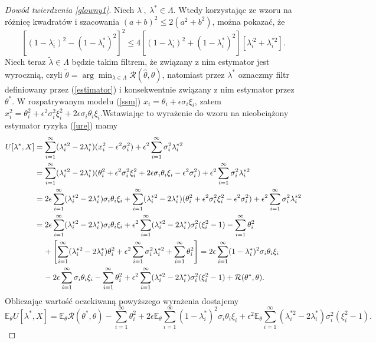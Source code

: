 \documentclass[man,mfiu]{mgrwms}
\begin{document}
\begin{proof}[Dowód twierdzenia \ref{glowny1}]
Niech $\lambda^{\cdot},\ \lambda^*\in \Lambda$. Wtedy korzystając ze wzoru na różnicę kwadratów i szacowania $(a+b)^2\leq 2(a^2+b^2)$, można pokazać, że
\begin{equation}\label{blad}
[(1-\lambda_i^{\cdot})^2-(1-\lambda_i^*)^2]^2\leq 4[(1-\lambda_i^{\cdot})^2+(1-\lambda_i^*)^2][\lambda_i^{\cdot 2}+\lambda_i^{*2}].
\end{equation}
Niech teraz $\tilde{\lambda}\in \Lambda$ będzie takim filtrem, że związany z nim estymator jest wyrocznią, czyli $\tilde{\theta}=\arg \min_{\lambda\in \Lambda}\mathcal{R}(\hat{\theta},\theta)$, natomiast przez $\lambda^*$ oznaczmy filtr definiowany przez (\ref{estimator}) i konsekwentnie związany z nim estymator przez $\theta^*$. W rozpatrywanym modelu (\ref{ssm}) $x_i=\theta_i+\epsilon\sigma_i\xi_i$, zatem $x_i^2=\theta_i^2+\epsilon^2\sigma_i^2\xi_i^2+2\epsilon\sigma_i\theta_i\xi_i$.Wstawiając to wyrażenie do wzoru na nieobciążony estymator ryzyka (\ref{ure}) mamy
\begin{displaymath}
\begin{split}
U[\lambda^*,X]&=\sum_{i=1}^{\infty}(\lambda_i^{*2}-2\lambda_i^*)(x_i^2-\epsilon^2\sigma_i^2)+\epsilon^2\sum_{i=1}^{\infty}\sigma_i^2\lambda_i^{*2}\\
&=\sum_{i=1}^{\infty}(\lambda_i^{*2}-2\lambda_i^*)(\theta_i^2+\epsilon^2\sigma_i^2\xi_i^2+2\epsilon\sigma_i\theta_i\xi_i-\epsilon^2\sigma_i^2)+\epsilon^2\sum_{i=1}^{\infty}\sigma_i^2\lambda_i^{*2}\\
&=2\epsilon\sum_{i=1}^{\infty}(\lambda_i^{*2}-2\lambda_i^*)\sigma_i\theta_i\xi_i+\sum_{i=1}^{\infty}(\lambda_i^{*2}-2\lambda_i^*)(\theta_i^2+\epsilon^2\sigma_i^2\xi_i^2-\epsilon^2\sigma_i^2)+\epsilon^2\sum_{i=1}^{\infty}\sigma_i^2\lambda_i^{*2}\\
&=2\epsilon\sum_{i=1}^{\infty}(\lambda_i^{*2}-2\lambda_i^*)\sigma_i\theta_i\xi_i+\epsilon^2\sum_{i=1}^{\infty}(\lambda_i^{*2}-2\lambda_i^*)\sigma_i^2(\xi_i^2-1)-\sum_{i=1}^{\infty}\theta_i^2\\
&\hspace{4mm}+\left[\sum_{i=1}^{\infty}(\lambda_i^{*2}-2\lambda_i^*)\theta_i^2+\epsilon^2\sum_{i=1}^{\infty}\sigma_i^2\lambda_i^{*2}+\sum_{i=1}^{\infty}\theta_i^2\right]=2\epsilon\sum_{i=1}^{\infty}(1-\lambda_i^*)^2\sigma_i\theta_i\xi_i\\
&\hspace{4mm}-2\epsilon\sum_{i=1}^{\infty}\sigma_i\theta_i\xi_i-\sum_{i=1}^{\infty}\theta_i^2+\epsilon^2\sum_{i=1}^{\infty}(\lambda_i^{*2}-2\lambda_i^*)\sigma_i^2(\xi_i^2-1)+\mathcal{R}(\theta^*,\theta).
\end{split}
\end{displaymath}
Obliczając wartość oczekiwaną powyższego wyrażenia dostajemy
\begin{equation}\label{ryzyko}
\mathbb{E}_{\theta}U[\lambda^*,X]=\mathbb{E}_{\theta}\mathcal{R}(\theta^*,\theta)-\sum_{i=1}^{\infty}\theta_i^2+2\epsilon\mathbb{E}_{\theta}\sum_{i=1}^{\infty}(1-\lambda_i^*)^2\sigma_i\theta_i\xi_i+\epsilon^2\mathbb{E}_{\theta}\sum_{i=1}^{\infty}(\lambda_i^{*2}-2\lambda_i^*)\sigma_i^2(\xi_i^2-1).
\end{equation}


\end{proof}
\end{document}
